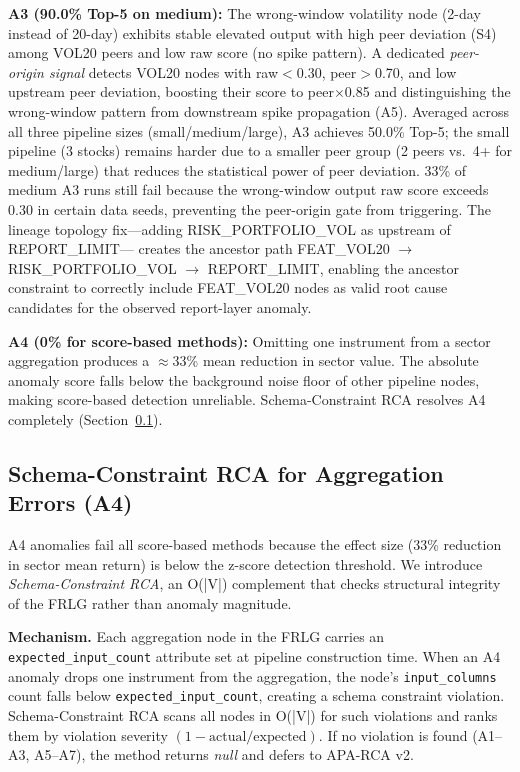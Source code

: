 \documentclass{article}
\newcommand{\aparca}{\textsc{APA-RCA}}
\begin{document}
\textbf{A3 (90.0\% Top-5 on medium):} The wrong-window volatility node (2-day instead of
20-day) exhibits stable elevated output with high peer deviation (S4) among VOL20 peers
and low raw score (no spike pattern). A dedicated \emph{peer-origin signal} detects
VOL20 nodes with raw$<$0.30, peer$>$0.70, and low upstream peer deviation,
boosting their score to peer$\times$0.85 and distinguishing the wrong-window
pattern from downstream spike propagation (A5).
Averaged across all three pipeline sizes (small/medium/large), A3 achieves 50.0\%
Top-5; the small pipeline (3 stocks) remains harder due to a smaller peer group
(2 peers vs.\ 4+ for medium/large) that reduces the statistical power of peer deviation.
33\% of medium A3 runs still fail because the wrong-window output raw score
exceeds 0.30 in certain data seeds, preventing the peer-origin gate from triggering.
The lineage topology fix---adding RISK\_PORTFOLIO\_VOL as upstream of REPORT\_LIMIT---
creates the ancestor path FEAT\_VOL20 $\to$ RISK\_PORTFOLIO\_VOL $\to$ REPORT\_LIMIT,
enabling the ancestor constraint to correctly include FEAT\_VOL20 nodes as valid
root cause candidates for the observed report-layer anomaly.

\textbf{A4 (0\% for score-based methods):} Omitting one instrument from a
sector aggregation produces a $\approx$33\% mean reduction in sector value.
The absolute anomaly score falls below the background noise floor of other
pipeline nodes, making score-based detection unreliable.
Schema-Constraint RCA resolves A4 completely (Section~\ref{sec:schema_constraint}).

\subsection{Schema-Constraint RCA for Aggregation Errors (A4)}
\label{sec:schema_constraint}

A4 anomalies fail all score-based methods because the effect size (33\% reduction
in sector mean return) is below the z-score detection threshold.
We introduce \emph{Schema-Constraint RCA}, an O(|V|) complement that checks
structural integrity of the FRLG rather than anomaly magnitude.

\textbf{Mechanism.}
Each aggregation node in the FRLG carries an \texttt{expected\_input\_count}
attribute set at pipeline construction time.
When an A4 anomaly drops one instrument from the aggregation, the node's
\texttt{input\_columns} count falls below \texttt{expected\_input\_count},
creating a schema constraint violation.
Schema-Constraint RCA scans all nodes in O(|V|) for such violations and ranks
them by violation severity $(1 - \text{actual}/\text{expected})$.
If no violation is found (A1--A3, A5--A7), the method returns \textit{null}
and defers to \aparca{} v2.
\end{document}
